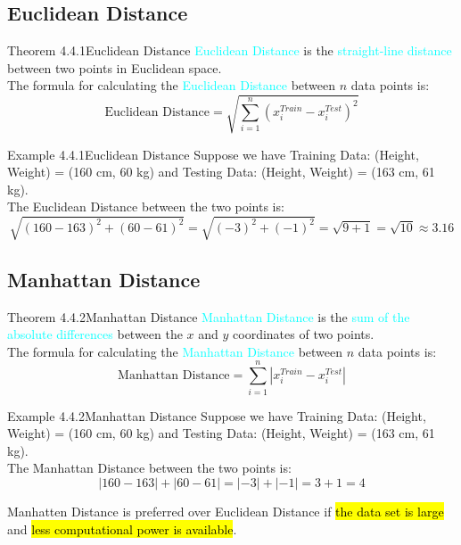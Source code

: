 \documentclass{book}
\begin{document}
\subsection{Euclidean Distance}
\begin{thmBox}{Theorem 4.4.1}{Euclidean Distance}
    \textcolor{cyan}{Euclidean Distance} is the \textcolor{cyan}{straight-line distance} between two points in Euclidean space.\\
    The formula for calculating the \textcolor{cyan}{Euclidean Distance} between \(n\) data points is:
    \[
        \text{Euclidean Distance} = \sqrt{\sum_{i=1}^{n} (x_i^{Train} - x_i^{Test})^2}
    \]
\end{thmBox}
\begin{egBox}{Example 4.4.1}{Euclidean Distance}
    Suppose we have Training Data: (Height, Weight) = (160 cm, 60 kg) and Testing Data: (Height, Weight) = (163 cm, 61 kg).\\
    The Euclidean Distance between the two points is:
    \[
        \sqrt{(160 - 163)^2 + (60 - 61)^2} = \sqrt{(-3)^2 + (-1)^2} = \sqrt{9 + 1} = \sqrt{10} \approx 3.16
    \]
\end{egBox}
\vspace{4mm}
\subsection{Manhattan Distance}
\begin{thmBox}{Theorem 4.4.2}{Manhattan Distance}
    \textcolor{cyan}{Manhattan Distance} is the \textcolor{cyan}{sum of the absolute differences} between the \(x\) and \(y\) coordinates of two points.\\
    The formula for calculating the \textcolor{cyan}{Manhattan Distance} between \(n\) data points is:
    \[
        \text{Manhattan Distance} = \sum_{i=1}^{n} |x_i^{Train} - x_i^{Test}|
    \]
\end{thmBox}
\begin{egBox}{Example 4.4.2}{Manhattan Distance}
    Suppose we have Training Data: (Height, Weight) = (160 cm, 60 kg) and Testing Data: (Height, Weight) = (163 cm, 61 kg).\\
    The Manhattan Distance between the two points is:
    \[
        |160 - 163| + |60 - 61| = |-3| + |-1| = 3 + 1 = 4
    \]
\end{egBox}
Manhatten Distance is preferred over Euclidean Distance if \hl{the data set is large} and \hl{less computational power is available}.\\
\newpage
\end{document}
